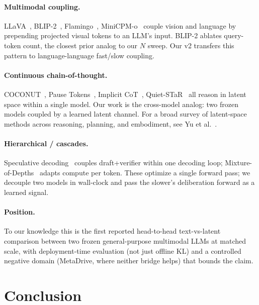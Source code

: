 \documentclass[11pt]{article}
\begin{document}
\paragraph{Multimodal coupling.} LLaVA~\cite{llava}, BLIP-2~\cite{blip2}, Flamingo~\cite{flamingo}, MiniCPM-o~\cite{minicpmo} couple vision and language by prepending projected visual tokens to an LLM's input. BLIP-2 ablates query-token count, the closest prior analog to our $N$ sweep. Our v2 transfers this pattern to language-language fast/slow coupling.

\paragraph{Continuous chain-of-thought.} COCONUT~\cite{coconut}, Pause Tokens~\cite{pause_tokens}, Implicit CoT~\cite{implicit_cot}, Quiet-STaR~\cite{quiet_star} all reason in latent space within a single model. Our work is the cross-model analog: two frozen models coupled by a learned latent channel. For a broad survey of latent-space methods across reasoning, planning, and embodiment, see Yu et al.~\cite{latentspacesurvey}.

\paragraph{Hierarchical / cascades.} Speculative decoding~\cite{speculative} couples draft+verifier within one decoding loop; Mixture-of-Depths~\cite{mod} adapts compute per token. These optimize a single forward pass; we decouple two models in wall-clock and pass the slower's deliberation forward as a learned signal.

\paragraph{Position.} To our knowledge this is the first reported head-to-head text-vs-latent comparison between two frozen general-purpose multimodal LLMs at matched scale, with deployment-time evaluation (not just offline KL) and a controlled negative domain (MetaDrive, where neither bridge helps) that bounds the claim.

\section{Conclusion}
\end{document}

